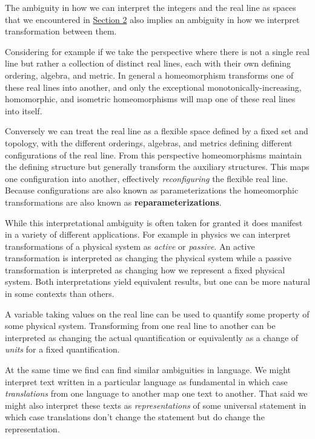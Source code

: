 \documentclass[
  letterpaper,
  DIV=11,
  numbers=noendperiod]{scrartcl}
\begin{document}
The ambiguity in how we can interpret the integers and the real line as
spaces that we encountered in
\protect\hyperlink{sec:proto-spaces}{Section 2} also implies an
ambiguity in how we interpret transformation between them.

Considering for example if we take the perspective where there is not a
single real line but rather a collection of distinct real lines, each
with their own defining ordering, algebra, and metric. In general a
homeomorphism transforms one of these real lines into another, and only
the exceptional monotonically-increasing, homomorphic, and isometric
homeomorphisms will map one of these real lines into itself.

Conversely we can treat the real line as a flexible space defined by a
fixed set and topology, with the different orderings, algebras, and
metrics defining different configurations of the real line. From this
perspective homeomorphisms maintain the defining structure but generally
transform the auxiliary structures. This maps one configuration into
another, effectively \emph{reconfiguring} the flexible real line.
Because configurations are also known as parameterizations the
homeomorphic transformations are also known as
\textbf{reparameterizations}.

While this interpretational ambiguity is often taken for granted it does
manifest in a variety of different applications. For example in physics
we can interpret transformations of a physical system as \emph{active}
or \emph{passive}. An active transformation is interpreted as changing
the physical system while a passive transformation is interpreted as
changing how we represent a fixed physical system. Both interpretations
yield equivalent results, but one can be more natural in some contexts
than others.

A variable taking values on the real line can be used to quantify some
property of some physical system. Transforming from one real line to
another can be interpreted as changing the actual quantification or
equivalently as a change of \emph{units} for a fixed quantification.

At the same time we find can find similar ambiguities in language. We
might interpret text written in a particular language as fundamental in
which case \emph{translations} from one language to another map one text
to another. That said we might also interpret these texts as
\emph{representations} of some universal statement in which case
translations don't change the statement but do change the
representation.
\end{document}
